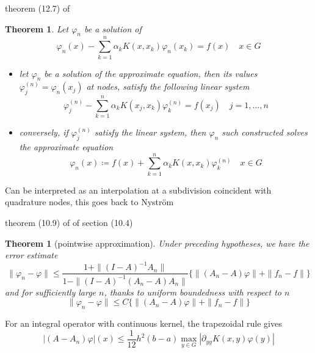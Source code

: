 \documentclass[10pt, a4paper, twoside, openright]{book}
\theoremstyle{definition}
\theoremstyle{plain}
\newtheorem{theorem}[subsection]{Theorem}
\theoremstyle{plain}
\theoremstyle{plain}
\theoremstyle{plain}
\theoremstyle{plain}
\theoremstyle{plain}
\theoremstyle{plain}
\theoremstyle{plain}
\let\phi\varphi
\begin{document}
\par
theorem (12.7) of \cite{kress:book}
\begin{theorem}
 Let $\phi_n$ be a solution of
 \begin{equation}
  \phi_n(x) -\sum_{k=1}^n\alpha_k K(x,x_k)\phi_n(x_k)=f(x) \quad x\in G
 \end{equation}
 \begin{itemize}
  \item let $\phi_n$ be a solution of the approximate equation, then its values $\phi_j^{(n)} = \phi_n(x_j)$ at nodes, satisfy the following linear system
  \begin{equation}
    \phi_j^{(n)} - \sum_{k=1}^n\alpha_k K(x_j,x_k)\phi_k^{(n)} = f(x_j)\quad j=1,...,n
  \end{equation}
  \item conversely, if $\phi_j^{(n)}$ satisfy the linear system, then $\phi_n$ such constructed solves the approximate equation
  \begin{equation}
   \phi_n(x)\coloneqq f(x) + \sum_{k=1}^n\alpha_k K(x,x_k)\phi_k^{(n)} \quad x\in G
  \end{equation}
 \end{itemize}
\end{theorem}
Can be interpreted as an interpolation at a subdivision coincident with quadrature nodes, this goes back to Nystr\"om
\par
theorem (10.9) of \cite{kress:book} of section (10.4)
\begin{theorem}[pointwise approximation]
 Under preceding hypotheses, we have the error estimate
 \begin{equation}
  \|\phi_n - \phi \| \leq \frac{1 + \|(I-A)^{-1}A_n\|}{1-\|(I-A)^{-1}(A_n-A)A_n\|}\{\|(A_n - A)\phi\| + \| f_n - f\|\}
 \end{equation}
 and for sufficiently large $n$, thanks to uniform boundedness with respect to $n$
 \begin{equation}
  \|\phi_n - \phi \| \leq C\{\|(A_n - A)\phi\| + \| f_n - f\|\}
 \end{equation}
\end{theorem}
For an integral operator with continuous kernel, the trapezoidal rule gives
\begin{equation}
 |(A - A_n)\phi|(x) \leq \frac{1}{12}h^2(b-a)\max_{y\in G}|\partial_{yy}K(x,y)\phi(y)|
\end{equation}
\end{document}
